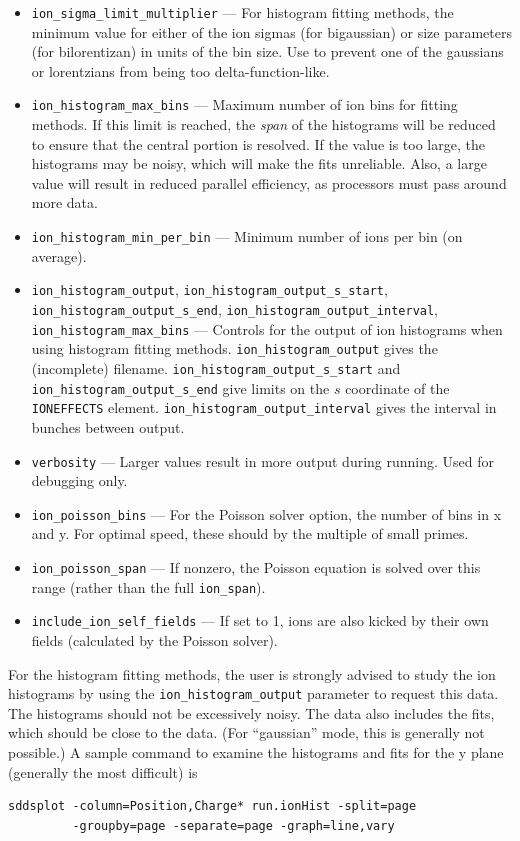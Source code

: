 \documentclass[11pt]{article}
\begin{document}
\begin{itemize}
  $m$ to get the range used.
\item \verb|ion_sigma_limit_multiplier| --- For  histogram fitting methods,
  the minimum value for either of the ion sigmas (for bigaussian) or size parameters (for bilorentizan)
  in units of the bin size. Use to prevent one of the gaussians or lorentzians from being too delta-function-like.
\item \verb|ion_histogram_max_bins| --- Maximum number of ion bins for fitting methods.
  If this limit is reached, the {\em span} of the histograms will  be reduced to ensure that the central portion is
  resolved.
  If the value is  too large, the histograms may
  be noisy, which will make the fits unreliable. Also, a large value will result in reduced parallel efficiency, as
  processors must pass around more data. 
\item \verb|ion_histogram_min_per_bin| --- Minimum number of ions per bin (on average).
\item \verb|ion_histogram_output|, \verb|ion_histogram_output_s_start|, \verb|ion_histogram_output_s_end|, 
      \verb|ion_histogram_output_interval|, \verb|ion_histogram_max_bins| --- Controls for the output of ion histograms when
      using histogram fitting methods.
      \verb|ion_histogram_output| gives the (incomplete) filename.
      \verb|ion_histogram_output_s_start| and \verb|ion_histogram_output_s_end| give limits on the $s$ coordinate of the
      \verb|IONEFFECTS| element. \verb|ion_histogram_output_interval| gives the interval in bunches between output.
    \item \verb|verbosity| --- Larger values result in more output during running. Used for debugging only.
    \item \verb|ion_poisson_bins| --- For the Poisson solver option, the number of bins in x and y.  For optimal speed, these should by the multiple of small primes.
    \item \verb|ion_poisson_span| --- If nonzero, the Poisson equation is solved over this range (rather than the full \verb|ion_span|).
\item \verb|include_ion_self_fields| --- If set to 1, ions are also kicked by their own fields (calculated by the Poisson solver). 
      
\end{itemize}

For the histogram fitting methods, the user is strongly advised to study the ion histograms by using the \verb|ion_histogram_output| parameter to request
this data.
The histograms should not be excessively noisy.
The data also includes the fits, which should be close to the data.
(For ``gaussian'' mode, this is generally not possible.)
A sample command to examine the histograms and fits for the y plane (generally the most difficult) is
\begin{verbatim}
sddsplot -column=Position,Charge* run.ionHist -split=page 
         -groupby=page -separate=page -graph=line,vary 
\end{verbatim}
\end{document}
